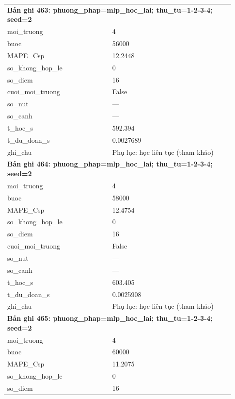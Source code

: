 \begin{longtable}{p{0.43\linewidth}p{0.50\linewidth}}
\midrule
\multicolumn{2}{p{0.95\linewidth}}{\textbf{Bản ghi 463: phuong\_phap=mlp\_hoc\_lai; thu\_tu=1-2-3-4; seed=2}} \\
moi\_\allowbreak truong & 4 \\
buoc & 56000 \\
MAPE\_\allowbreak Csp & 12.2448 \\
so\_\allowbreak khong\_\allowbreak hop\_\allowbreak le & 0 \\
so\_\allowbreak diem & 16 \\
cuoi\_\allowbreak moi\_\allowbreak truong & False \\
so\_\allowbreak nut & — \\
so\_\allowbreak canh & — \\
t\_\allowbreak hoc\_\allowbreak s & 592.394 \\
t\_\allowbreak du\_\allowbreak doan\_\allowbreak s & 0.0027689 \\
ghi\_\allowbreak chu & Phụ lục: học liên tục (tham khảo) \\
\midrule
\multicolumn{2}{p{0.95\linewidth}}{\textbf{Bản ghi 464: phuong\_phap=mlp\_hoc\_lai; thu\_tu=1-2-3-4; seed=2}} \\
moi\_\allowbreak truong & 4 \\
buoc & 58000 \\
MAPE\_\allowbreak Csp & 12.4754 \\
so\_\allowbreak khong\_\allowbreak hop\_\allowbreak le & 0 \\
so\_\allowbreak diem & 16 \\
cuoi\_\allowbreak moi\_\allowbreak truong & False \\
so\_\allowbreak nut & — \\
so\_\allowbreak canh & — \\
t\_\allowbreak hoc\_\allowbreak s & 603.405 \\
t\_\allowbreak du\_\allowbreak doan\_\allowbreak s & 0.0025908 \\
ghi\_\allowbreak chu & Phụ lục: học liên tục (tham khảo) \\
\midrule
\multicolumn{2}{p{0.95\linewidth}}{\textbf{Bản ghi 465: phuong\_phap=mlp\_hoc\_lai; thu\_tu=1-2-3-4; seed=2}} \\
moi\_\allowbreak truong & 4 \\
buoc & 60000 \\
MAPE\_\allowbreak Csp & 11.2075 \\
so\_\allowbreak khong\_\allowbreak hop\_\allowbreak le & 0 \\
so\_\allowbreak diem & 16 \\

\end{longtable}
